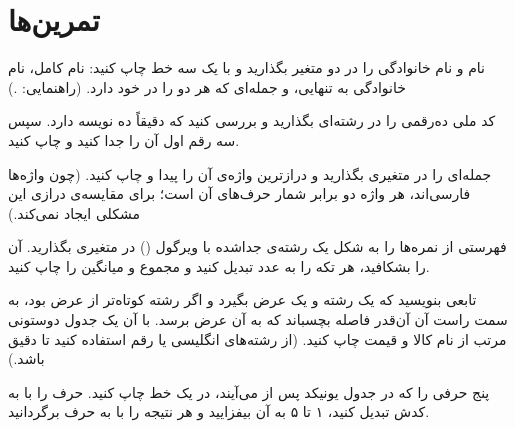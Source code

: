 \section*{تمرین‌ها}

\exercise نام و نام خانوادگی را در دو متغیر بگذارید و با یک 
سه خط چاپ کنید: نام کامل، نام خانوادگی به تنهایی، و جمله‌ای که هر دو را
در خود دارد. (راهنمایی: .)

\exercise کد ملی ده‌رقمی را در رشته‌ای بگذارید و بررسی کنید که دقیقاً ده
نویسه دارد. سپس سه رقم اول آن را جدا کنید و چاپ کنید.

\exercise جمله‌ای را در متغیری بگذارید و درازترین واژه‌ی آن را پیدا و
چاپ کنید. (چون واژه‌ها فارسی‌اند،  هر واژه دو برابر شمار
حرف‌های آن است؛ برای مقایسه‌ی درازی این مشکلی ایجاد نمی‌کند.)

\exercise فهرستی از نمره‌ها را به شکل یک رشته‌ی جداشده با ویرگول
() در متغیری بگذارید. آن را بشکافید، هر تکه را به
عدد تبدیل کنید و مجموع و میانگین را چاپ کنید.

\exercise تابعی بنویسید که یک رشته و یک عرض بگیرد و اگر رشته کوتاه‌تر از
عرض بود، به سمت راست آن آن‌قدر فاصله بچسباند که به آن عرض برسد. با آن
یک جدول دوستونی مرتب از نام کالا و قیمت چاپ کنید. (از رشته‌های انگلیسی
یا رقم استفاده کنید تا  دقیق باشد.)

\exercise پنج حرفی را که در جدول یونیکد پس از  می‌آیند، در یک خط
چاپ کنید. حرف را با  به کدش تبدیل کنید، ۱ تا ۵ به آن
بیفزایید و هر نتیجه را با  به حرف برگردانید.
